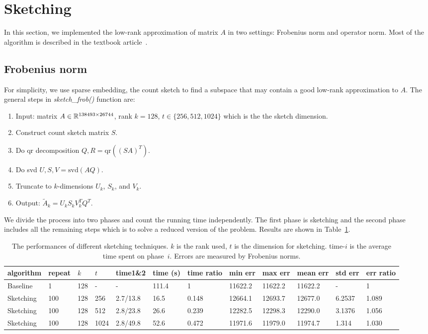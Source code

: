 \section{Sketching}

In this section,
we implemented the low-rank approximation of matrix $A$
in two settings: Frobenius norm and operator norm.
Most of the algorithm is described in the textbook
article~\cite{woodruff2014sketching}.

\subsection{Frobenius norm}
For simplicity, we use sparse embedding, \ie the count sketch
to find a subspace that may contain a good low-rank approximation to $A$.
The general steps in \textit{sketch\_frob()} function are:
\begin{enumerate}
    \item Input: matrix $A\in {\mathbb{R}}^{138493\times 26744}$,
        rank $k=128$,
        $t\in\{256, 512, 1024\}$ which is the the sketch dimension.
    \item Construct count sketch matrix $S$.
    \item Do qr decomposition $Q, R = \text{qr}((SA)^T)$.
    \item Do svd $U, S, V = \text{svd}(AQ)$.
    \item Truncate to $k$-dimensions $U_k$, $S_k$, and $V_k$.
    \item Output: $\tilde{A}_k = U_k S_k V_k^T Q^T$.
\end{enumerate}

We divide the process into two phases and count the running time independently.
The first phase is sketching and
the second phase includes all the remaining steps
which is to solve a reduced version of the problem.
Results are shown in Table~\ref{tab:frob}.

\begin{table}[htb]
  \setlength{\tabcolsep}{2.6pt}
  \caption{The performances of different sketching techniques.
  $k$ is the rank used, $t$ is the dimension for sketching.
  time-$i$ is the average time spent on phase~$i$.
  Errors are measured by Frobenius norms.
    }
  \label{tab:frob}
  \centering
  {\small
  \begin{tabular}{llllllllllll}
    \toprule
    algorithm & repeat & $k$ & $t$ & time1\&2 & time (s) & time ratio & min err & max err & mean err & std err & err ratio \\
    \midrule
    Baseline & 1 & 128 & - & - & 111.4 & 1 & 11622.2 & 11622.2 & 11622.2 & - & 1 \\
    Sketching & 100 & 128 & 256 & 2.7/13.8 & 16.5 & 0.148 & 12664.1 & 12693.7 & 12677.0 & 6.2537 & 1.089 \\
    Sketching & 100 & 128 & 512 & 2.8/23.8 & 26.6 & 0.239 & 12282.5 & 12298.3 & 12290.0 & 3.1376 & 1.056 \\
    Sketching & 100 & 128 & 1024 & 2.8/49.8 & 52.6 & 0.472 & 11971.6 & 11979.0 & 11974.7 & 1.314 & 1.030 \\
    \bottomrule
  \end{tabular}
  }
\end{table}

